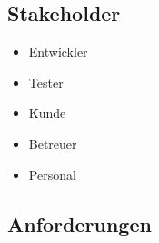\documentclass[oneside,a4paper,titlepage]{scrartcl} %
\begin{document}
\subsection{Stakeholder}
\begin{itemize}
    \item Entwickler
    \item Tester
    \item Kunde
    \item Betreuer
    \item Personal
\end{itemize}

\newpage

\subsection{Anforderungen}

\end{document}
